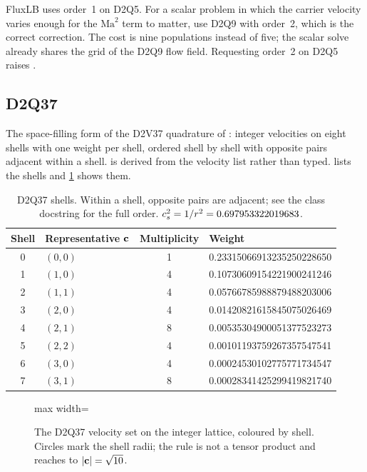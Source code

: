 FluxLB uses order~1 on D2Q5. For a scalar problem in which the carrier velocity varies
enough for the $\mathrm{Ma}^2$ term to matter, use D2Q9 with order~2, which is the correct
correction. The cost is nine populations instead of five; the scalar solve already shares
the grid of the D2Q9 flow field. Requesting order~2 on D2Q5 raises .

\subsection{D2Q37}

The space-filling form of the D2V37 quadrature of \textcite{Philippi2006}: integer
velocities on eight shells with one weight per shell, ordered shell by shell with opposite
pairs adjacent within a shell.  is derived from the velocity list rather than
typed.  lists the shells and \cref{fig:d2q37} shows them.

\begin{table}[h]
\centering\small
\begin{tabular}{@{}clcl@{}}
\toprule
Shell & Representative $\mathbf{c}$ & Multiplicity & Weight \\
\midrule
0 & $(0,0)$ & 1 & 0.23315066913235250228650 \\
1 & $(1,0)$ & 4 & 0.10730609154221900241246 \\
2 & $(1,1)$ & 4 & 0.05766785988879488203006 \\
3 & $(2,0)$ & 4 & 0.01420821615845075026469 \\
4 & $(2,1)$ & 8 & 0.00535304900051377523273 \\
5 & $(2,2)$ & 4 & 0.00101193759267357547541 \\
6 & $(3,0)$ & 4 & 0.00024530102775771734547 \\
7 & $(3,1)$ & 8 & 0.00028341425299419821740 \\
\bottomrule
\end{tabular}
\caption{D2Q37 shells. Within a shell, opposite pairs are adjacent; see the class docstring
for the full order. $c_s^2 = 1/r^2 = 0.697953322019683$.}
\label{tab:d2q37}
\end{table}

\begin{figure}[h]
\centering
\begin{adjustbox}{max width=\linewidth}\end{adjustbox}
\caption{The D2Q37 velocity set on the integer lattice, coloured by shell. Circles mark the
shell radii; the rule is not a tensor product and reaches to $|\mathbf{c}| = \sqrt{10}$.}
\label{fig:d2q37}
\end{figure}

